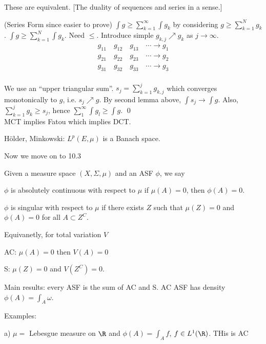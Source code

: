 These are equivalent. [The duality of sequences and series in a sense.]

\pf (Series Form since easier to prove) $\int g \geq \sum_{k=1}^\infty \int g_k$ by considering $g \geq \sum_{k=1}^N g_k$. $\int g \geq \sum_{k=1}^N \int g_k$. Need $\leq$. Introduce simple $g_{k,j} \nearrow g_k$ as $j \to \infty$.
	\[
	\begin{split}
	g_{11} \quad g_{12} \quad g_{13} \quad \cdots \to g_1 \\
	g_{21} \quad g_{22} \quad g_{23} \quad \cdots \to g_2 \\
	g_{31} \quad g_{32} \quad g_{33} \quad \cdots \to g_3 \\
	\end{split}
	\]

We use an ``upper triangular sum''. $s_j = \sum_{k=1}^j g_{k,j}$ which converges monotonically to $g$, i.e. $s_j \nearrow g$. By second lemma above, $\int s_j \to \int g$. Also, $\sum_{k=1}^j g_k \geq s_j$, hence $\sum_1^\infty \int g_l \geq \int g$. \qed \\



MCT implies Fatou which implies DCT.

H\"older, Minkowski: $L^p(E,\mu)$ is a Banach space. 


Now we move on to 10.3 


Given a measure space $(X, \Sigma, \mu)$ and an ASF $\phi$, we say

\begin{dfn}
$\phi$ is absolutely continuous with respect to $\mu$ if $\mu(A)=0$, then $\phi(A)=0$. 
\end{dfn}


\begin{dfn}[Singular]
$\phi$ is singular with respect to $\mu$ if there exists $Z$ such that $\mu(Z)=0$ and $\phi(A)= 0$ for all $A \subset Z^C$. 
\end{dfn}


Equivanetly, for total variation $V$

AC: $\mu(A)=0$ then $V(A)=0$

S: $\mu(Z)=0$ and $V(Z^C)=0$.

Main results: every ASF is the sum of AC and S. AC ASF has density $\phi(A)= \int_A \omega$.

Examples:

a) $\mu=$ Lebesgue measure on $\R$ and $\phi(A)= \int_A f$, $f \in L^1(\R)$. THis is AC


